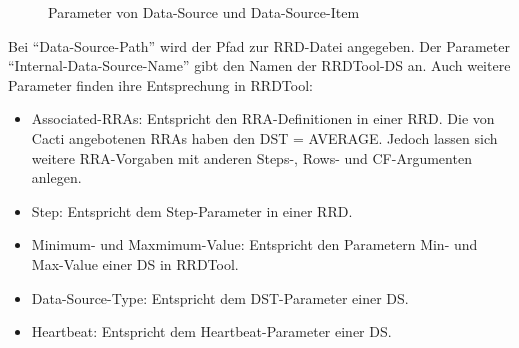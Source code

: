 \documentclass[12pt,ngerman,toc=listofnumbered,toc=bibliographynumbered,toc=index,headsepline=true]{scrbook}
\begin{document}
\begin{figure}[ht]
  \centering
  \caption{Parameter von Data-Source und Data-Source-Item}
  \label{fig:datasource}
\end{figure}

Bei \enquote{Data-Source-Path} wird der Pfad zur RRD-Datei angegeben. Der
Parameter \enquote{Internal-Data-Source-Name} gibt den Namen der RRDTool-DS an.
Auch weitere Parameter finden ihre Entsprechung in RRDTool:
\begin{itemize}
  \item Associated-RRAs: Entspricht den RRA-Definitionen in einer RRD. Die von
  Cacti angebotenen RRAs haben den DST = AVERAGE. Jedoch lassen sich weitere
  RRA-Vorgaben mit anderen Steps-, Rows- und CF-Argumenten anlegen.
  \item Step: Entspricht dem Step-Parameter in einer RRD.
  \item Minimum- und Maxmimum-Value: Entspricht den Parametern Min- und
  Max-Value einer DS in RRDTool.
  \item Data-Source-Type: Entspricht dem DST-Parameter einer DS.
  \item Heartbeat: Entspricht dem Heartbeat-Parameter einer DS.
\end{itemize}
\end{document}
